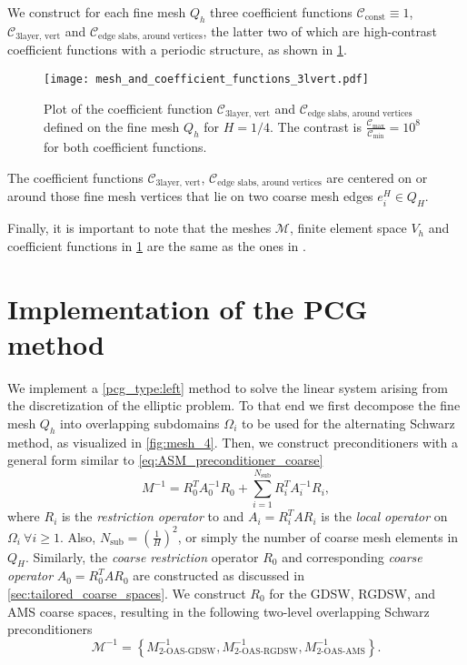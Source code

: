 We construct for each fine mesh $Q_h$ three coefficient functions $\mathcal{C}_{\text{const}}\equiv 1$, $\mathcal{C}_{\text{3layer, vert}}$ and $\mathcal{C}_{\text{edge slabs, around vertices}}$, the latter two of which are high-contrast coefficient functions with a periodic structure, as shown in \cref{fig:coefficient_functions}. 
\begin{figure}[H]
    \texttt{[image: mesh\_and\_coefficient\_functions\_3lvert.pdf]}
    \caption{Plot of the coefficient function $\mathcal{C}_{\text{3layer, vert}}$ and $\mathcal{C}_{\text{edge slabs, around vertices}}$ defined on the fine mesh $Q_h$ for $H=1/4$. The contrast is $\frac{\mathcal{C}_{\text{max}}}{\mathcal{C}_{\text{min}}} = 10^8$ for both coefficient functions.}
    \label{fig:coefficient_functions}
\end{figure}
The coefficient functions $\mathcal{C}_{\text{3layer, vert}}$, $\mathcal{C}_{\text{edge slabs, around vertices}}$ are centered on or around those fine mesh vertices that lie on two coarse mesh edges $e_i^H\in Q_H$.

Finally, it is important to note that the meshes $\mathcal{M}$, finite element space $V_h$ and coefficient functions in \cref{fig:coefficient_functions} are the same as the ones in \cite{ams_coarse_space_comp_study_Alves2024}.

\section{Implementation of the PCG method}\label{sec:implementation_pcg}
We implement a \ref{pcg_type:left} method to solve the linear system arising from the discretization of the elliptic problem. To that end we first decompose the fine mesh $Q_h$ into overlapping subdomains $\Omega_i$ to be used for the alternating Schwarz method, as visualized in \cref{fig:mesh_4}. Then, we construct preconditioners with a general form similar to \cref{eq:ASM_preconditioner_coarse}
\[
    M^{-1} = R_0^T A_0^{-1} R_0 + \sum_{i=1}^{N_{\text{sub}}} R_i^T A_i^{-1} R_i,
\]
where $R_i$ is the \textit{restriction operator} to and $A_i = R_i^T A R_i$ is the \textit{local operator} on $\Omega_i \ \forall i \geq 1$. Also, $N_{\text{sub}} = \left(\frac{1}{H}\right)^2$, or simply the number of coarse mesh elements in $Q_H$. Similarly, the \textit{coarse restriction} operator $R_0$ and corresponding \textit{coarse operator} $A_0 = R_0^T A R_0$ are constructed as discussed in \cref{sec:tailored_coarse_spaces}. We construct $R_0$ for the GDSW, RGDSW, and AMS coarse spaces, resulting in the following two-level overlapping Schwarz preconditioners
\begin{equation}
    \mathcal{M}^{-1} =  \left\{M^{-1}_{\text{2-OAS-GDSW}}, M^{-1}_{\text{2-OAS-RGDSW}}, M^{-1}_{\text{2-OAS-AMS}}\right\}.
    \label{eq:preconditioners}
\end{equation}